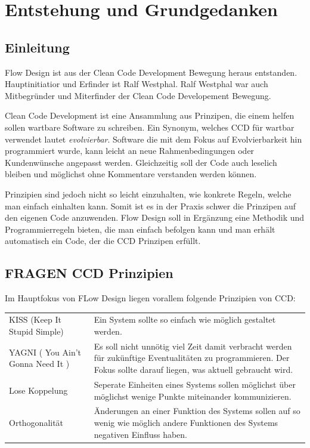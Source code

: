 \documentclass[11pt]{article}
\date{\today}
\title{}
\begin{document}
\tableofcontents

\section{Entstehung und Grundgedanken}
\label{sec:orgheadline10}

\subsection{Einleitung}
\label{sec:orgheadline1}

Flow Design ist aus der Clean Code Development Bewegung heraus entstanden. Hauptinitiatior und Erfinder ist Ralf Westphal.
Ralf Westphal war auch Mitbegründer und Miterfinder der Clean Code Developement Bewegung.


Clean Code Development ist eine Ansammlung aus Prinzipen, die einem helfen
sollen wartbare Software zu schreiben. Ein Synonym, welches CCD für wartbar
verwendet lautet \emph{evolvierbar}. 
Software die mit dem Fokus auf Evolvierbarkeit hin programmiert wurde,
kann leicht an neue Rahmenbedingungen oder Kundenwünsche angepasst werden.
Gleichzeitig soll der Code auch leselich bleiben und möglichst ohne Kommentare
verstanden werden können.

Prinzipien sind jedoch nicht so leicht einzuhalten, wie konkrete Regeln, welche man einfach einhalten kann.
Somit ist es in der Praxis schwer die Prinzipen auf den eigenen Code anzuwenden.
Flow Design soll in Ergänzung eine Methodik und Programmierregeln bieten, die man einfach befolgen kann und man erhält automatisch
ein Code, der die CCD Prinzipen erfüllt.

\subsection{{\bfseries\sffamily FRAGEN} CCD Prinzipien}
\label{sec:orgheadline6}
Im Hauptfokus von FLow Design liegen vorallem folgende Prinzipien von CCD:

\begin{center}
\begin{tabular}{ll}
KISS (Keep It Stupid Simple) & Ein System sollte so einfach wie möglich gestaltet werden.\\
YAGNI ( You Ain't Gonna Need It ) & Es soll nicht unnötig viel Zeit damit verbracht werden für zukünftige Eventualitäten zu programmieren. Der Fokus sollte darauf liegen, was aktuell gebraucht wird.\\
Lose Koppelung & Seperate Einheiten eines Systems sollen möglichst über möglichst wenige Punkte miteinander kommunizieren.\\
Orthogonalität & Änderungen an einer Funktion des Systems sollen auf so wenig wie möglich andere Funktionen des Systems negativen Einfluss haben.\\
\end{tabular}
\end{center}
\end{document}
